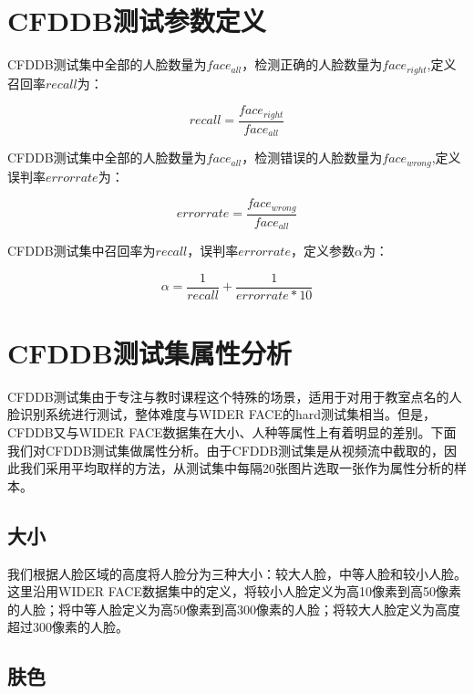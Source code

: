\section{CFDDB测试参数定义}

CFDDB测试集中全部的人脸数量为$face_{all}$，检测正确的人脸数量为$face_{right}$,定义召回率$recall$为：

\begin{displaymath}
\label{eq:rdef}
recall = \frac{face_{right}}{face_{all}} 
\end{displaymath}

CFDDB测试集中全部的人脸数量为$face_{all}$，检测错误的人脸数量为$face_{wrong}$,定义误判率$errorrate$为：

\begin{displaymath}
\label{eq:edef}
errorrate = \frac{face_{wrong}}{face_{all}} 
\end{displaymath}

CFDDB测试集中召回率为$recall$，误判率$errorrate$，定义参数$\alpha$为：

\begin{displaymath}
\label{eq:alphadef}
\alpha = \frac{1}{recall} + \frac{1}{errorrate*10}
\end{displaymath}

\section{CFDDB测试集属性分析}

CFDDB测试集由于专注与教时课程这个特殊的场景，适用于对用于教室点名的人脸识别系统进行测试，整体难度与WIDER FACE的hard测试集相当。但是，CFDDB又与WIDER FACE数据集在大小、人种等属性上有着明显的差别。下面我们对CFDDB测试集做属性分析。由于CFDDB测试集是从视频流中截取的，因此我们采用平均取样的方法，从测试集中每隔20张图片选取一张作为属性分析的样本。

\subsection{大小}

我们根据人脸区域的高度将人脸分为三种大小：较大人脸，中等人脸和较小人脸。这里沿用WIDER FACE数据集中的定义，将较小人脸定义为高10像素到高50像素的人脸；将中等人脸定义为高50像素到高300像素的人脸；将较大人脸定义为高度超过300像素的人脸。

\subsection{肤色}

